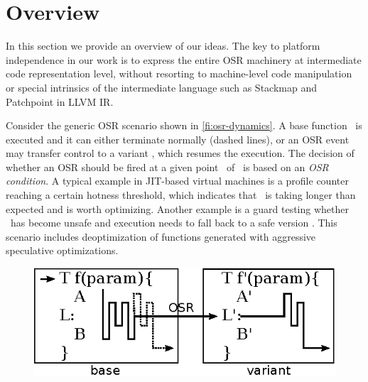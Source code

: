
\section{Overview}
\label{se:overview}

In this section we provide an overview of our ideas. The key to platform independence in our work is to express the entire OSR machinery at intermediate code representation level, without resorting to machine-level code manipulation or special intrinsics of the intermediate language such as Stackmap and Patchpoint in LLVM IR. %


Consider the generic OSR scenario shown in \myfigure\ref{fi:osr-dynamics}. A base function \fbase\ is executed and it can either terminate normally (dashed lines), or an OSR event may transfer control to a variant \fvariant, which resumes the execution. The decision of whether an OSR should be fired at a given point \osrpoint\ of \fbase\ is based on an {\em OSR condition}. A typical example in JIT-based virtual machines is a profile counter reaching a certain hotness threshold, which indicates that \fbase\ is taking longer than expected and is worth optimizing. Another example is a guard testing whether \fbase\ has become unsafe and execution needs to fall back to a safe version \fvariant. This scenario includes deoptimization of functions generated with aggressive speculative optimizations. 

\ifdefined\noauthorea
\begin{figure}[t]
\begin{center}
\includegraphics[width=0.6\columnwidth]{figures/overview-osr/overview-osr.eps}
\caption{\protect}
\end{center}
\end{figure}
\fi


